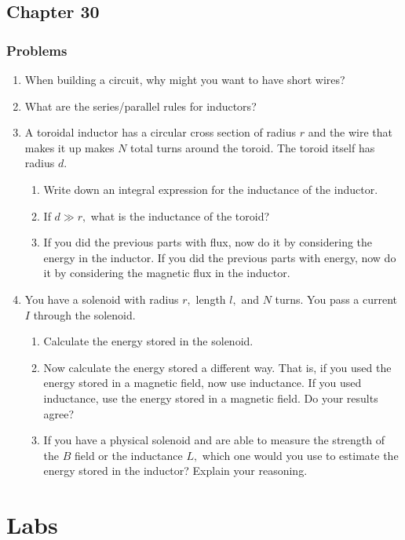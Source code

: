 \documentclass[12pt]{book}
\begin{document}
\section{Chapter 30}

\subsection{Problems}

\begin{enumerate}
 \item When building a circuit, why might you want to have short wires?
 \item What are the series/parallel rules for inductors?
 \item A toroidal inductor has a circular cross section of radius $r$ and the wire that makes it up makes $N$ total turns around the toroid. The toroid itself has radius $d.$
 \begin{enumerate}
 \item Write down an integral expression for the inductance of the inductor.
 \item If $d\gg r,$ what is the inductance of the toroid?
 \item If you did the previous parts with flux, now do it by considering the energy in the inductor. If you did the previous parts with energy, now do it by considering the magnetic flux in the inductor.
 \end{enumerate}
 \item You have a solenoid with radius $r,$ length $l,$ and $N$ turns. You pass a current $I$ through the solenoid.
 \begin{enumerate}
 \item Calculate the energy stored in the solenoid.
 \item Now calculate the energy stored a different way. That is, if you used the energy stored in a magnetic field, now use inductance. If you used inductance, use the energy stored in a magnetic field. Do your results agree?
 \item If you have a physical solenoid and are able to measure the strength of the $B$ field or the inductance $L,$ which one would you use to estimate the energy stored in the inductor? Explain your reasoning.
 \end{enumerate}
\end{enumerate}


\chapter{Labs}
\end{document}
